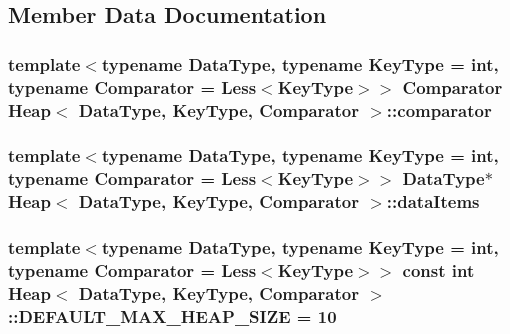 \subsection{\-Member \-Data \-Documentation}
\hypertarget{class_heap_adc20ebd4d97dff37f19ced91ccdc4560}{
\subsubsection[{comparator}]{\setlength{\rightskip}{0pt plus 5cm}template$<$typename \-Data\-Type, typename \-Key\-Type = int, typename \-Comparator = \-Less$<$\-Key\-Type$>$$>$ \-Comparator {\bf \-Heap}$<$ \-Data\-Type, \-Key\-Type, \-Comparator $>$\-::{\bf comparator}}}\label{class_heap_adc20ebd4d97dff37f19ced91ccdc4560}
\hypertarget{class_heap_ace779ec73409a031eda4a7c1b898eb56}{
\subsubsection[{data\-Items}]{\setlength{\rightskip}{0pt plus 5cm}template$<$typename \-Data\-Type, typename \-Key\-Type = int, typename \-Comparator = \-Less$<$\-Key\-Type$>$$>$ \-Data\-Type$\ast$ {\bf \-Heap}$<$ \-Data\-Type, \-Key\-Type, \-Comparator $>$\-::{\bf data\-Items}}}\label{class_heap_ace779ec73409a031eda4a7c1b898eb56}
\hypertarget{class_heap_a967c19732a20a72e8e824402ad6763c8}{
\subsubsection[{\-D\-E\-F\-A\-U\-L\-T\-\_\-\-M\-A\-X\-\_\-\-H\-E\-A\-P\-\_\-\-S\-I\-Z\-E}]{\setlength{\rightskip}{0pt plus 5cm}template$<$typename \-Data\-Type, typename \-Key\-Type = int, typename \-Comparator = \-Less$<$\-Key\-Type$>$$>$ const int {\bf \-Heap}$<$ \-Data\-Type, \-Key\-Type, \-Comparator $>$\-::{\bf \-D\-E\-F\-A\-U\-L\-T\-\_\-\-M\-A\-X\-\_\-\-H\-E\-A\-P\-\_\-\-S\-I\-Z\-E} = 10}}\label{class_heap_a967c19732a20a72e8e824402ad6763c8}
